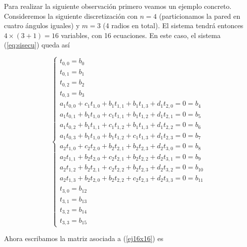 Para realizar la siguiente observación primero veamos un ejemplo concreto. Consideremos la siguiente discretización con $n = 4$ (particionamos la pared en cuatro ángulos iguales) y $m = 3$ (4 radios en total). El sistema tendrá entonces $4\times (3+1) = 16$ variables, con 16 ecuaciones. En este caso, el sistema (\ref{eq:sisecu}) queda así

\begin{equation}
\label{ej16x16}
  \left\lbrace
  \begin{array}{l}
     t_{0,0} = b_0 \\
     t_{0,1} = b_1 \\
     t_{0,2} = b_2 \\
     t_{0,3} = b_3 \\
		 a_1 t_{0,0} + c_1 t_{1,0} + b_1 t_{1, 1} + b_1 t_{1, 3} + d_1 t_{2,0} 		= 0 = b_{4}	\\
		 a_1 t_{0,1} + b_1 t_{1,0} + c_1 t_{1,1} + b_1 t_{1,2} + d_1 t_{2,1} 		 	= 0 = b_{5}	\\
	   a_1 t_{0,2} + b_1 t_{1,1} + c_1 t_{1,2} + b_1 t_{1,3} + d_1 t_{2,2} 			= 0 = b_{6}	\\
		 a_1 t_{0,3} + b_1 t_{1,0} + b_1 t_{1,2} + c_1 t_{1,3} + d_1 t_{2,3} 			= 0 = b_{7}	\\
		 a_2 t_{1,0} + c_2 t_{2,0} + b_2 t_{2,1} + b_2 t_{2,3} + d_2 t_{3,0}			= 0 = b_{8}	\\
		 a_2 t_{1,1} + b_2 t_{2,0} + c_2 t_{2,1} + b_2 t_{2,2} + d_2 t_{3,1} 		 	= 0 = b_{9}	\\
	   a_2 t_{1,2} + b_2 t_{2,1} + c_2 t_{2,2} + b_2 t_{2,3} + d_2 t_{3,2} 			= 0 = b_{10}	\\
		 a_2 t_{1,3} + b_2 t_{2,0} + b_2 t_{2,2} + c_2 t_{2,3} + d_2 t_{3,3} 			= 0 = b_{11}	\\
     t_{3,0} = b_{12} \\
     t_{3,1} = b_{13} \\
     t_{3,2} = b_{14} \\
     t_{3,3} = b_{15}     		 
  \end{array}
  \right.
\end{equation}

Ahora escribamos la matriz asociada a (\ref{ej16x16}) es \vspace{1em}

